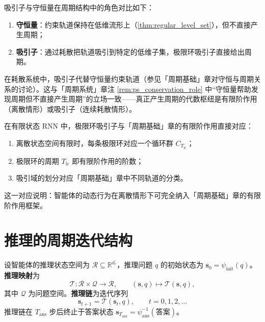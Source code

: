 \begin{remark}[吸引子与守恒量的对比]\label{rem:attractor_vs_conservation}
吸引子与守恒量在周期结构中的角色对比如下：
\begin{enumerate}[label=(\roman*)]
    \item \textbf{守恒量}：约束轨道保持在低维流形上（\cref{thm:regular_level_set}），但不直接产生周期；
    \item \textbf{吸引子}：通过耗散把轨道吸引到特定的低维子集，极限环吸引子直接给出周期。
\end{enumerate}
在耗散系统中，吸引子代替守恒量约束轨道（参见「周期基础」章对守恒与周期关系的讨论）。这与「周期系统」章注 \ref{rem:ps_conservation_role} 中“守恒量帮助发现周期但不直接产生周期”的立场一致——真正产生周期的代数枢纽是有限阶作用（离散情形）或吸引子（连续耗散情形）。
\end{remark}

\begin{remark}[吸引子与有限阶作用的关系]\label{rem:attractor_finite_order}
在有限状态 RNN 中，极限环吸引子与「周期基础」章的有限阶作用直接对应：
\begin{enumerate}[label=(\roman*)]
    \item 离散状态空间有限时，每条极限环对应一个循环群 $C_{T_{\text{lc}}}$；
    \item 极限环的周期 $T_{\text{lc}}$ 即有限阶作用的阶数；
    \item 吸引域的划分对应「周期基础」章中不同轨道的分类。
\end{enumerate}
这一对应说明：智能体的动态行为在离散情形下可完全纳入「周期基础」章的有限阶作用框架。
\end{remark}

\section{推理的周期迭代结构}
\label{sec:reasoning_periodicity}

\begin{definition}[推理链与推理映射]\label{def:reasoning_chain}
设智能体的推理状态空间为 $\mathcal{R}\subseteq\mathbb{R}^{d_r}$，推理问题 $q$ 的初始状态为 $\mathbf{s}_0=\psi_{\text{init}}(q)$。\textbf{推理映射}为
\[
\mathcal{T}:\mathcal{R}\times\mathcal{Q}\to\mathcal{R},\qquad
(\mathbf{s},q)\mapsto\mathcal{T}(\mathbf{s},q),
\]
其中 $\mathcal{Q}$ 为问题空间。\textbf{推理链}为迭代序列
\[
\mathbf{s}_{t+1}=\mathcal{T}(\mathbf{s}_t,q),\qquad t=0,1,2,\dots
\]
推理链在 $T_{\text{ans}}$ 步后终止于答案状态 $\mathbf{s}_{T_{\text{ans}}}=\psi_{\text{ans}}^{-1}(\text{答案})$。
\end{definition}

